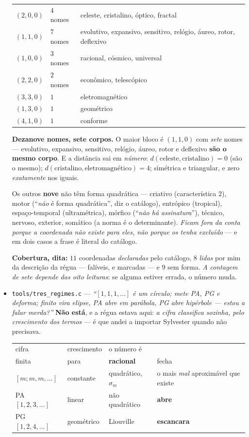 \documentclass[11pt]{article}
\newcommand{\code}[1]{\texttt{\small #1}}
\theoremstyle{plain}
\theoremstyle{remark}
\begin{document}
\begin{itemize}
\begin{center}\begin{tabular}{lll}
$(2,0,0)$ & $4$ nomes & celeste, cristalino, óptico, fractal \\
$(1,1,0)$ & $7$ nomes & evolutivo, expansivo, sensitivo, relógio, áureo, rotor, deflexivo \\
$(1,0,0)$ & $3$ nomes & racional, cósmico, universal \\
$(2,2,0)$ & $2$ nomes & econômico, telescópico \\
$(3,3,0)$ & $1$ & eletromagnético \\
$(1,3,0)$ & $1$ & geométrico \\
$(4,1,0)$ & $1$ & conforme \\
\end{tabular}\end{center}

\textbf{Dezanove nomes, sete corpos.} O maior bloco é $(1,1,0)$ com \emph{sete} nomes --- evolutivo,
expansivo, sensitivo, relógio, áureo, rotor e deflexivo \textbf{são o mesmo corpo}. E a distância
sai em \emph{número}: $d(\text{celeste},\text{cristalino}) = 0$ (são o mesmo);
$d(\text{cristalino},\text{eletromagnético}) = 4$; simétrica e triangular, e zero \emph{exatamente}
nos iguais.

Os outros \textbf{nove} não têm forma quadrática --- criativo (característica $2$), motor
(``\emph{não} é forma quadrática'', diz o catálogo), entrópico (tropical), espaço-temporal
(ultramétrica), mórfico (``\emph{não há assinatura}''), técnico, nervoso, exterior, somático (a
norma é o determinante). \emph{Ficam fora da conta porque a coordenada não existe para eles, não
porque os tenha excluído} --- e em dois casos a frase é literal do catálogo.

\textbf{Cobertura, dita:} $11$ coordenadas \emph{declaradas} pelo catálogo, $8$ \emph{lidas} por
mim da descrição da régua --- falíveis, e marcadas --- e $9$ sem forma. \emph{A contagem de sete
depende das oito leituras}: se alguma estiver errada, o número muda.
\item \code{tools/tres\_regimes.c} --- \emph{``$[1,1,1,\dots]$ é um círculo; mete PA, PG e
deforma; finito vira elipse, PA abre em parábola, PG abre hipérbole --- estou a falar merda?''}
\textbf{Não está}, e a régua estava aqui: \emph{a cifra classifica sozinha, pelo crescimento dos
termos} --- é que andei a importar Sylvester quando não precisava.

\begin{center}\begin{tabular}{llll}
cifra & crescimento & o número é & \\
finita & para & \textbf{racional} & fecha \\
$[m;m,m,\dots]$ & constante & quadrático, $\sigma_m$ & o mais \emph{mal} aproximável que existe \\
PA $[1,2,3,\dots]$ & linear & não quadrático & \textbf{abre} \\
PG $[1,2,4,\dots]$ & geométrico & Liouville & \textbf{escancara} \\
\end{tabular}\end{center}


\end{itemize}
\end{document}
